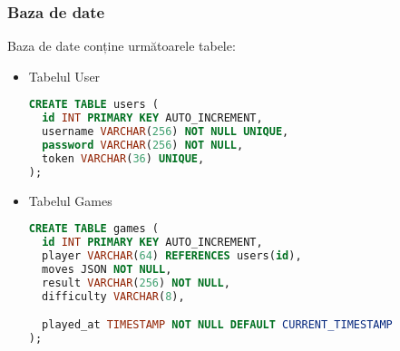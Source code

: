 \vspace{2cm}
\subsubsection{Baza de date}

Baza de date conține următoarele tabele:

\begin{itemize}

	\item Tabelul User
	      \begin{lstlisting}[language=sql]
CREATE TABLE users (
  id INT PRIMARY KEY AUTO_INCREMENT,
  username VARCHAR(256) NOT NULL UNIQUE,
  password VARCHAR(256) NOT NULL,
  token VARCHAR(36) UNIQUE,
);
\end{lstlisting}

	\item Tabelul Games
	      \begin{lstlisting}[language=sql]
CREATE TABLE games (
  id INT PRIMARY KEY AUTO_INCREMENT,
  player VARCHAR(64) REFERENCES users(id),
  moves JSON NOT NULL,
  result VARCHAR(256) NOT NULL,
  difficulty VARCHAR(8),

  played_at TIMESTAMP NOT NULL DEFAULT CURRENT_TIMESTAMP
);
\end{lstlisting}

\end{itemize}
